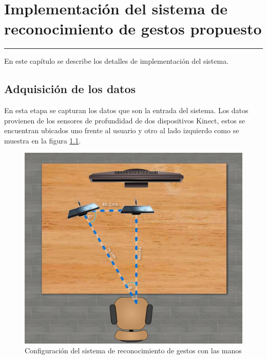 \chapter{Implementación del sistema de reconocimiento de gestos propuesto}\label{capit:cap4}
\vspace{-2.0325ex}%
\noindent
\rule{\textwidth}{0.5pt}
\vspace{-5.5ex}%
\newcommand{\pushline}{\Indp}%

En este cap\'itulo se describe los detalles de implementación del sistema.  

\section{Adquisición de los datos}\label{sec:AdquisicionDatos}

En esta etapa se capturan los datos que son la entrada del sistema. Los datos provienen de los sensores de profundidad de dos dispositivos Kinect, estos se encuentran ubicados uno frente al  usuario y otro al lado  izquierdo como se muestra en la figura \ref{fig:SetupSystem}.

\begin{figure}[!h]
\begin{center}
\includegraphics[scale=.2]{./Figures/system.png}
\end{center}
\caption{Configuración del sistema de reconocimiento de gestos con las manos}
\label{fig:SetupSystem}
\end{figure} 
 
